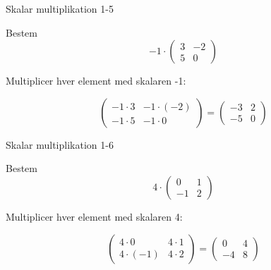 \documentclass{article}
\begin{document}
\newpage

\begin{exercise}{Skalar multiplikation 1-5}

Bestem
\[
-1 \cdot \begin{pmatrix} 3 & -2 \\ 5 & 0 \end{pmatrix}
\]


\hint

Multiplicer hver element med skalaren -1:

\hint
\[
\begin{pmatrix} -1 \cdot 3 & -1 \cdot (-2) \\ -1 \cdot 5 & -1 \cdot 0 \end{pmatrix} = \begin{pmatrix} -3 & 2 \\ -5 & 0 \end{pmatrix}
\]

\end{exercise}

\newpage

\begin{exercise}{Skalar multiplikation 1-6}

Bestem
\[
4 \cdot \begin{pmatrix} 0 & 1 \\ -1 & 2 \end{pmatrix}
\]


\hint

Multiplicer hver element med skalaren 4:

\hint
\[
\begin{pmatrix} 4 \cdot 0 & 4 \cdot 1 \\ 4 \cdot (-1) & 4 \cdot 2 \end{pmatrix} = \begin{pmatrix} 0 & 4 \\ -4 & 8 \end{pmatrix}
\]

\end{exercise}
\end{document}
